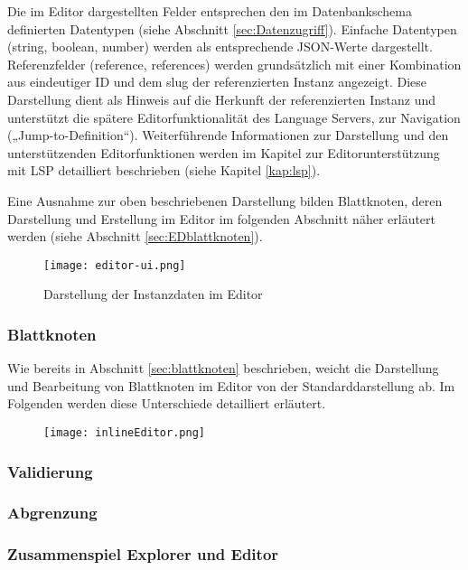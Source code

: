 Die im Editor dargestellten Felder entsprechen den im Datenbankschema definierten Datentypen (siehe Abschnitt \ref{sec:Datenzugriff}). Einfache Datentypen (string, boolean, number) werden als entsprechende JSON-Werte dargestellt. Referenzfelder (reference, references) werden grundsätzlich mit einer Kombination aus eindeutiger ID und dem slug der referenzierten Instanz angezeigt. Diese Darstellung dient als Hinweis auf die Herkunft der referenzierten Instanz und unterstützt die spätere Editorfunktionalität des Language Servers, zur Navigation („Jump-to-Definition“). Weiterführende Informationen zur Darstellung und den unterstützenden Editorfunktionen werden im Kapitel zur Editorunterstützung mit LSP detailliert beschrieben (siehe Kapitel \ref{kap:lsp}).

Eine Ausnahme zur oben beschriebenen Darstellung bilden Blattknoten, deren Darstellung und Erstellung im Editor im folgenden Abschnitt näher erläutert werden (siehe Abschnitt \ref{sec:EDblattknoten}).

\begin{figure}[H]
\centering
\texttt{[image: editor-ui.png]}
\caption{Darstellung der Instanzdaten im Editor}
\label{fig:editor-ui}
\end{figure}

\newpage
\subsubsection*{Blattknoten}
\label{sec:EDblattknoten}
Wie bereits in Abschnitt \ref{sec:blattknoten} beschrieben, weicht die Darstellung und Bearbeitung von Blattknoten im Editor von der Standarddarstellung ab. Im Folgenden werden diese Unterschiede detailliert erläutert.

\begin{figure}[H]
\centering
\texttt{[image: inlineEditor.png]}
\caption{}
\label{fig:inlineEditor}
\end{figure}

\subsubsection*{Validierung}

\subsubsection*{Abgrenzung}


\subsubsection{Zusammenspiel Explorer und Editor}


